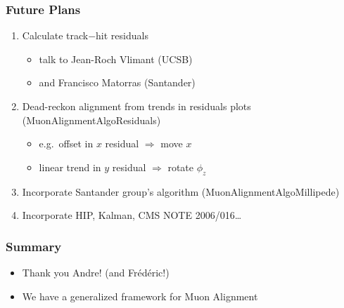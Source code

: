 \documentclass[12pt,compress]{beamer}
\begin{document}
\begin{frame}
\frametitle{Future Plans}
\begin{enumerate}\setlength{\itemsep}{0.4 cm}
\item Calculate track$-$hit residuals
\begin{itemize}
\item talk to Jean-Roch Vlimant (UCSB)
\item and Francisco Matorras (Santander)
\end{itemize}

\item Dead-reckon alignment from trends in residuals plots (MuonAlignmentAlgoResiduals)
\begin{itemize}
\item e.g.\ offset in $x$ residual $\Rightarrow$ move $x$
\item linear trend in $y$ residual $\Rightarrow$ rotate $\phi_z$
\end{itemize}

\item Incorporate Santander group's algorithm (MuonAlignmentAlgoMillipede)

\item Incorporate HIP, Kalman, CMS NOTE 2006/016\ldots
\end{enumerate}
\end{frame}

\begin{frame}
\frametitle{Summary}
\begin{itemize}\setlength{\itemsep}{1 cm}
\item Thank you Andre! (and Fr\'ed\'eric!)
\item We have a generalized framework for Muon Alignment
\end{itemize}
\label{numpages}
\end{frame}
\end{document}
